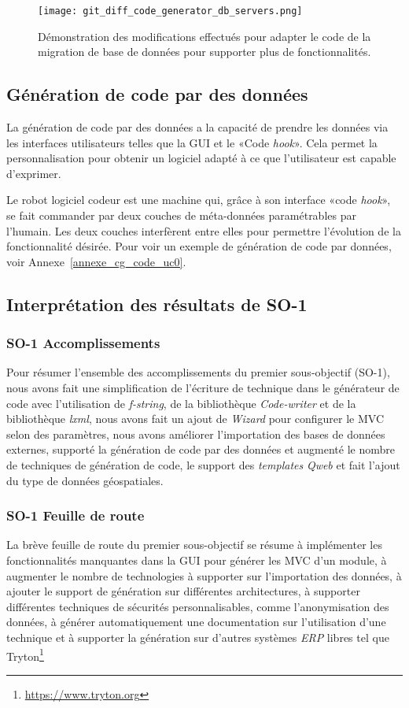 \begin{figure}[htb]
\centering
\texttt{[image: git\_diff\_code\_generator\_db\_servers.png]}
\caption{Démonstration des modifications effectués pour adapter le code de la migration de base de données pour supporter plus de fonctionnalités.}
\label{fig:dia_cg_db_servers}
\end{figure}

\subsection{Génération de code par des données}

La génération de code par des données a la capacité de prendre les données via les interfaces utilisateurs telles que la GUI et le «Code \textit{hook}». Cela permet la personnalisation pour obtenir un logiciel adapté à ce que l’utilisateur est capable d’exprimer.

Le robot logiciel codeur est une machine qui, grâce à son interface «code \textit{hook}», se fait commander par deux couches de méta-données paramétrables par l’humain. Les deux couches interfèrent entre elles pour permettre l’évolution de la fonctionnalité désirée. Pour voir un exemple de génération de code par données, voir Annexe~\ref{annexe_cg_code_uc0}.

\subsection{Interprétation des résultats de SO-1}

\subsubsection{SO-1 Accomplissements}
Pour résumer l'ensemble des accomplissements du premier sous-objectif (SO-1), nous avons fait une simplification de l’écriture de technique dans le générateur de code avec l’utilisation de \textit{f-string}, de la bibliothèque \textit{Code-writer }et de la bibliothèque \textit{lxml}, nous avons fait un ajout de \textit{Wizard} pour configurer le MVC selon des paramètres, nous avons améliorer l’importation des bases de données externes, supporté la génération de code par des données et augmenté le nombre de techniques de génération de code, le support des \textit{templates} \textit{Qweb} et fait l'ajout du type de données géospatiales.

\subsubsection{SO-1 Feuille de route}
La brève feuille de route du premier sous-objectif se résume à implémenter les fonctionnalités manquantes dans la GUI pour générer les MVC d’un module, à augmenter le nombre de technologies à supporter sur l'importation des données, à ajouter le support de génération sur différentes architectures, à supporter différentes techniques de sécurités personnalisables, comme l’anonymisation des données, à générer automatiquement une documentation sur l’utilisation d’une technique et à supporter la génération sur d’autres systèmes \textit{ERP} libres tel que Tryton\footnote{\url{https://www.tryton.org}}

